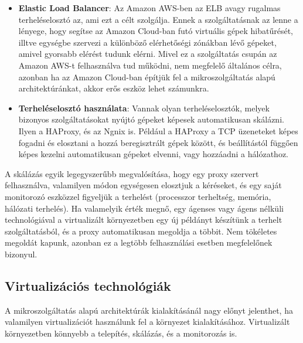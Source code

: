 \documentclass[11pt,magyar,a4paper,twoside,]{report}
\begin{document}
\begin{itemize}
\item
  \textbf{Elastic Load Balancer}\citep{elastic-load-balance}: Az Amazon
  AWS-ben az ELB avagy rugalmas terheléselosztó az, ami ezt a célt
  szolgálja. Ennek a szolgáltatásnak az lenne a lényege, hogy segítse az
  Amazon Cloud-ban futó virtuális gépek hibatűrését, illtve egységbe
  szervezi a különböző elérhetőségi zónákban lévő gépeket, amivel
  gyorsabb elérést tudunk elérni. Mivel ez a szolgáltatás csupán az
  Amazon AWS-t felhasználva tud működni, nem megfelelő általános célra,
  azonban ha az Amazon Cloud-ban építjük fel a mikroszolgáltatás alapú
  architektúránkat, akkor erős eszköz lehet számunkra.
\item
  \textbf{Terheléselosztó használata}: Vannak olyan terheléselosztók,
  melyek bizonyos szolgáltatásokat nyújtó gépeket képesek automatikusan
  skálázni. Ilyen a HAProxy, és az Ngnix is. Például a HAProxy a TCP
  üzeneteket képes fogadni és elosztani a hozzá beregisztrált gépek
  között, és beállítástól függően képes kezelni automatikusan gépeket
  elvenni, vagy hozzáadni a hálózathoz.
\end{itemize}

A skálázás egyik legegyszerűbb megvalósítása, hogy egy proxy szervert
felhasználva, valamilyen módon egységesen elosztjuk a kéréseket, és egy
saját monitorozó eszközzel figyeljük a terhelést (processzor terheltség,
memória, hálózati terhelés). Ha valamelyik érték megnő, egy ágenses vagy
ágens nélküli technológiával a virtualizált környezetben egy új példányt
készítünk a terhelt szolgáltatásból, és a proxy automatikusan megoldja a
többit. Nem tökéletes megoldát kapunk, azonban ez a legtöbb
felhasználási esetben megfelelőnek bizonyul.

\subsection{Virtualizációs
technológiák}\label{virtualizuxe1ciuxf3s-technoluxf3giuxe1k}

A mikroszolgáltatás alapú architektúrák kialakításánál nagy előnyt
jelenthet, ha valamilyen virtualizációt használunk fel a környezet
kialakításához. Virtualizált környezetben könnyebb a telepítés,
skálázás, és a monitorozás is.
\end{document}
